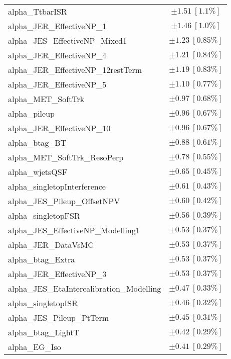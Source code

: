 \begin{table}
\begin{center}
\begin{tabular*}{\textwidth}{@{\extracolsep{\fill}}lc}
alpha\_TtbarISR         & $\pm 1.51\ [1.1\%] $       \\
alpha\_JER\_EffectiveNP\_1         & $\pm 1.46\ [1.0\%] $       \\
alpha\_JES\_EffectiveNP\_Mixed1         & $\pm 1.23\ [0.85\%] $       \\
alpha\_JER\_EffectiveNP\_4         & $\pm 1.21\ [0.84\%] $       \\
alpha\_JER\_EffectiveNP\_12restTerm         & $\pm 1.19\ [0.83\%] $       \\
alpha\_JER\_EffectiveNP\_5         & $\pm 1.10\ [0.77\%] $       \\
alpha\_MET\_SoftTrk         & $\pm 0.97\ [0.68\%] $       \\
alpha\_pileup         & $\pm 0.96\ [0.67\%] $       \\
alpha\_JER\_EffectiveNP\_10         & $\pm 0.96\ [0.67\%] $       \\
alpha\_btag\_BT         & $\pm 0.88\ [0.61\%] $       \\
alpha\_MET\_SoftTrk\_ResoPerp         & $\pm 0.78\ [0.55\%] $       \\
alpha\_wjetsQSF         & $\pm 0.65\ [0.45\%] $       \\
alpha\_singletopInterference         & $\pm 0.61\ [0.43\%] $       \\
alpha\_JES\_Pileup\_OffsetNPV         & $\pm 0.60\ [0.42\%] $       \\
alpha\_singletopFSR         & $\pm 0.56\ [0.39\%] $       \\
alpha\_JES\_EffectiveNP\_Modelling1         & $\pm 0.53\ [0.37\%] $       \\
alpha\_JER\_DataVsMC         & $\pm 0.53\ [0.37\%] $       \\
alpha\_btag\_Extra         & $\pm 0.53\ [0.37\%] $       \\
alpha\_JER\_EffectiveNP\_3         & $\pm 0.53\ [0.37\%] $       \\
alpha\_JES\_EtaIntercalibration\_Modelling         & $\pm 0.47\ [0.33\%] $       \\
alpha\_singletopISR         & $\pm 0.46\ [0.32\%] $       \\
alpha\_JES\_Pileup\_PtTerm         & $\pm 0.45\ [0.31\%] $       \\
alpha\_btag\_LightT         & $\pm 0.42\ [0.29\%] $       \\
alpha\_EG\_Iso         & $\pm 0.41\ [0.29\%] $       \\

\end{tabular*}
\end{center}
\end{table}
